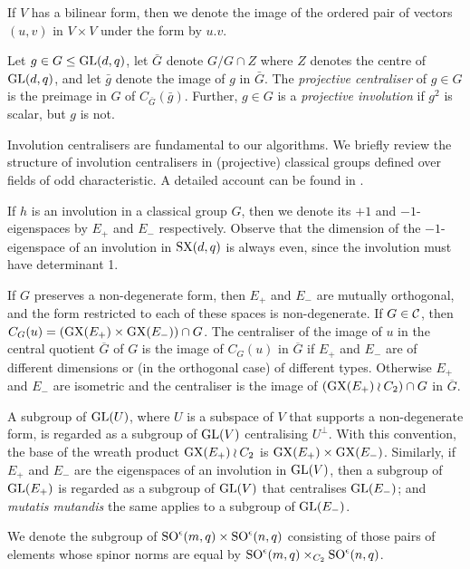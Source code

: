 \documentclass[12pt]{article}
\def\SO{{\rm SO}}
\def\GL{{\rm GL}}
\def\C{{\cal C}}
\def\SX{{\rm SX}}
\def\GX{{\rm GX}}
\begin{document}
If $V$ has a bilinear form, then we denote the image of 
the ordered pair of vectors $(u,v)$ in $V\times V$ under the form by $u.v$.

Let $g\in G \leq \GL(d, q)$, 
let $\bar{G}$ denote $G / G \cap Z$
where $Z$ denotes the centre of $\GL(d, q)$,
and let $\bar{g}$ denote the image of $g$ in $\bar{G}$.
The {\it projective centraliser} of $g \in G$
is the preimage in $G$ of $C_{\bar{G}} (\bar{g})$.
Further, $g \in G$ is a {\it projective involution} 
if $g^2$ is scalar, but $g$ is not.

Involution centralisers are fundamental to our algorithms.
We briefly review the structure of involution
centralisers in (projective) classical groups defined  over fields of
odd characteristic. A detailed account can be  found in \cite[4.5.1]{GLS3}. 

If $h$ is an involution in a 
classical group $G$, then we denote its  
$+1$ and $-1$-eigenspaces  by $E_+$ and $E_-$ respectively.  
Observe that the dimension of the $-1$-eigenspace of 
an involution in $\SX(d,q)$ is always even, since the 
involution must have determinant 1.  

If $G$ preserves a non-degenerate form, then 
$E_+$ and $E_-$ are mutually orthogonal, and the form restricted to
each of these spaces is non-degenerate. If $G \in \C$, then 
$C_G(u)=(\GX(E_+)\times\GX(E_-))\cap G$.  The
centraliser of the image of $u$ in the central quotient $\overline{G}$
of $G$ is the image of $C_G(u)$ in $\overline{G}$ if $E_+$ and $E_-$
are of different dimensions or (in the orthogonal case) of different
types. Otherwise $E_+$ and $E_-$ are isometric and 
the centraliser is the image of $(\GX(E_+)\wr C_2)\cap G$ in $\overline{G}$.

A subgroup of $\GL(U)$, where $U$ is a subspace of
$V$ that supports a non-degenerate form, 
is regarded  as a subgroup of $\GL(V)$ centralising $U^\perp$. With
this convention, the base of the wreath product $\GX(E_+)\wr C_2$ is
$\GX(E_+)\times\GX(E_-)$.  Similarly, if $E_+$  and $E_-$ are the
eigenspaces of an involution in $\GL(V)$,  then a subgroup of $\GL(E_+)$ is
regarded  as a subgroup of $\GL(V)$ that centralises $\GL(E_-)$; and
{\it mutatis mutandis} the same applies to a subgroup of $\GL(E_-)$.

We denote the subgroup 
of $\SO^\epsilon (m, q) \times \SO^\epsilon (n, q)$
consisting of those pairs of elements 
whose spinor norms are equal by $\SO^\epsilon(m, q)
\times_{C_2}\SO^\epsilon(n, q)$. 
\end{document}
